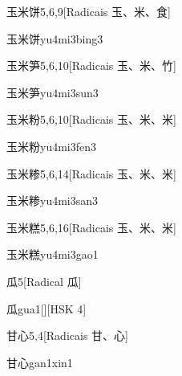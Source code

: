 \begin{entry}{玉米饼}{5,6,9}[Radicais ⽟、⽶、⾷]
  \begin{phonetics}{玉米饼}{yu4mi3bing3}
  \end{phonetics}
\end{entry}

\begin{entry}{玉米笋}{5,6,10}[Radicais ⽟、⽶、⽵]
  \begin{phonetics}{玉米笋}{yu4mi3sun3}
  \end{phonetics}
\end{entry}

\begin{entry}{玉米粉}{5,6,10}[Radicais ⽟、⽶、⽶]
  \begin{phonetics}{玉米粉}{yu4mi3fen3}
  \end{phonetics}
\end{entry}

\begin{entry}{玉米糁}{5,6,14}[Radicais ⽟、⽶、⽶]
  \begin{phonetics}{玉米糁}{yu4mi3san3}
  \end{phonetics}
\end{entry}

\begin{entry}{玉米糕}{5,6,16}[Radicais ⽟、⽶、⽶]
  \begin{phonetics}{玉米糕}{yu4mi3gao1}
  \end{phonetics}
\end{entry}

\begin{entry}{瓜}{5}[Radical ⽠]
  \begin{phonetics}{瓜}{gua1}[][HSK 4]
  \end{phonetics}
\end{entry}

\begin{entry}{甘心}{5,4}[Radicais ⽢、⼼]
  \begin{phonetics}{甘心}{gan1xin1}
  \end{phonetics}
\end{entry}

